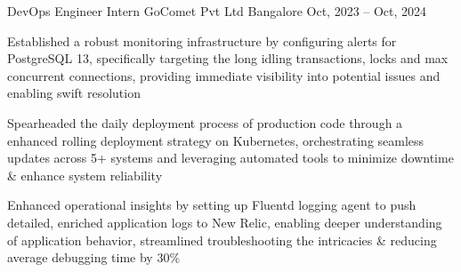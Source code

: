 \documentclass[]{awesome-cv}
\begin{document}
\begin{cventries}
    \vspace{-2mm}
    \cventry
    {DevOps Engineer Intern}
    {GoComet Pvt Ltd}
    {Bangalore}
    {Oct, 2023 – Oct, 2024}
    {\begin{cvitems}
            \item {Established a robust monitoring infrastructure by configuring alerts for PostgreSQL 13, specifically targeting the long idling transactions, locks and max concurrent connections, providing immediate visibility into potential issues and enabling swift resolution}
            \item {Spearheaded the daily deployment process of production code through a enhanced rolling deployment strategy on Kubernetes, orchestrating seamless updates across 5+ systems and leveraging automated tools to minimize downtime \& enhance system reliability}
            \item {Enhanced operational insights by setting up Fluentd logging agent to push detailed, enriched application logs to New Relic, enabling deeper understanding of application behavior, streamlined troubleshooting the intricacies \& reducing average debugging time by 30\%}
        \end{cvitems}}


\end{cventries}
\end{document}
